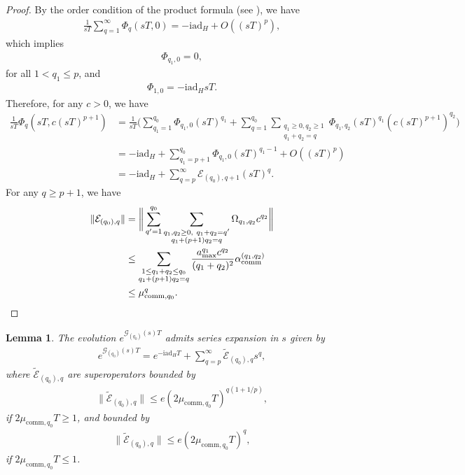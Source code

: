 \documentclass[11pt]{article}
\newtheorem{lemma}{Lemma}
\renewcommand{\i}{\mathrm{i}}
\renewcommand{\L}{\mathcal{L}}
\newcommand{\ad}{\mathrm{ad}}
\newcommand{\G}{\mathcal{G}}
\newcommand{\E}{\mathcal{E}}
\begin{document}
\begin{proof}
    By the order condition of the product formula (see \citep[Lemma 2]{watson2025exponentially}), we have \begin{align*}
        \frac{1}{sT}\sum_{q=1}^{\infty} \Phi_{q}(sT,0) = -\i \ad_H + O((sT)^p),
    \end{align*}
    which implies \begin{align*}
        \Phi_{q_1, 0} = 0,
    \end{align*}
    for all $1 <q_1 \le p$, and \begin{align*}
        \Phi_{1,0} = - \i \ad_H sT.
    \end{align*} 
    Therefore, for any $c>0$, we have \begin{align*}
        \frac{1}{sT} \Phi_{q}(sT,c(sT)^{p+1})&= \frac{1}{sT}\Big(\sum_{q_1=1}^{q_0}\Phi_{q_1, 0}(sT)^{q_1} + \sum_{q = 1}^{q_0}\sum_{\substack{q_1\ge 0,q_2\ge 1\\ q_1+q_2 = q}} \Phi_{q_1, q_2} (sT)^{q_1}(c(sT)^{p+1})^{q_2}\Big) \\
        & = -\i \ad_H + \sum_{q_1 = p+1}^{q_0} \Phi_{q_1, 0} (sT)^{q_1-1} + O((sT)^{p}) \\
        & = -\i \ad_H + \sum_{q = p}^{\infty} \E_{(q_0),q+1} (sT)^{q}.
    \end{align*}
    For any $q\ge p+1$, we have \begin{align*}
        \|\E_{(q_0),q}\| &= \bigg\|\sum_{q'=1}^{q_0}\sum_{\substack{q_1, q_2\ge 0,~ q_1+q_2=q' \\
        q_1+(p+1)q_2 = q}} \Omega_{q_1,q_2} c^{q_2} \bigg\|\\
        &\le \sum_{\substack{1\le q_1+ q_2\le q_0 \\
        q_1+(p+1)q_2 = q}}\frac{a_{\max}^{q_1}c^{q_2}}{(q_1+q_2)^2} \alpha_{\rm comm}^{(q_1, q_2)} \\
        &\le  \mu_{\mathrm{comm},q_0}^q.
    \end{align*}
\end{proof}
\begin{lemma}
\label{lem:expansion-exp-G(s)}
    The evolution $e^{\G_{(q_0)}(s) T}$ admits series expansion in $s$ given by \begin{align*}
        e^{\G_{(q_0)}(s) T}=e^{-\i \ad_H T}+ \sum_{q=p}^{\infty}\tilde{\E}_{(q_0),q} s^q,
    \end{align*}
    where $\tilde{\E}_{(q_0),q}$ are superoperators bounded by \begin{align*}
       \|\tilde{\E}_{(q_0),q}\|\le   e(2\mu_{\mathrm{comm},q_0}T)^{q(1+1/p)},
    \end{align*}
    if $2\mu_{\mathrm{comm},q_0}T\ge 1$, and bounded by \begin{align*}
        \|\tilde{\E}_{(q_0),q}\|\le e(2\mu_{\mathrm{comm},q_0}T)^{q},
    \end{align*}
    if $2\mu_{\mathrm{comm},q_0}T\le 1$.
\end{lemma}
\end{document}

